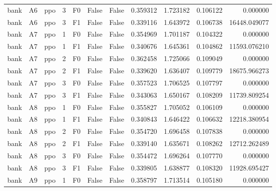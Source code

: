 \begin{tabular}{lllrlllrrrr}
      bank &      A6 &       ppo &     3 &  F0 &           False &            False &  0.359312 &  1.723182 & 0.106122 &         0.000000 \\
      bank &      A6 &       ppo &     3 &  F1 &           False &            False &  0.339116 &  1.643972 & 0.106738 &     16448.049077 \\
      bank &      A7 &       ppo &     1 &  F0 &           False &            False &  0.354969 &  1.701187 & 0.104322 &         0.000000 \\
      bank &      A7 &       ppo &     1 &  F1 &           False &            False &  0.340676 &  1.645361 & 0.104862 &     11593.076210 \\
      bank &      A7 &       ppo &     2 &  F0 &           False &            False &  0.362458 &  1.725066 & 0.109049 &         0.000000 \\
      bank &      A7 &       ppo &     2 &  F1 &           False &            False &  0.339620 &  1.636407 & 0.109779 &     18675.966273 \\
      bank &      A7 &       ppo &     3 &  F0 &           False &            False &  0.357523 &  1.706525 & 0.107797 &         0.000000 \\
      bank &      A7 &       ppo &     3 &  F1 &           False &            False &  0.343063 &  1.650167 & 0.108209 &     11739.809254 \\
      bank &      A8 &       ppo &     1 &  F0 &           False &            False &  0.355827 &  1.705052 & 0.106109 &         0.000000 \\
      bank &      A8 &       ppo &     1 &  F1 &           False &            False &  0.340843 &  1.646422 & 0.106632 &     12218.380954 \\
      bank &      A8 &       ppo &     2 &  F0 &           False &            False &  0.354720 &  1.696458 & 0.107838 &         0.000000 \\
      bank &      A8 &       ppo &     2 &  F1 &           False &            False &  0.339140 &  1.635671 & 0.108262 &     12712.262489 \\
      bank &      A8 &       ppo &     3 &  F0 &           False &            False &  0.354472 &  1.696264 & 0.107770 &         0.000000 \\
      bank &      A8 &       ppo &     3 &  F1 &           False &            False &  0.339805 &  1.638877 & 0.108320 &     11928.695427 \\
      bank &      A9 &       ppo &     1 &  F0 &           False &            False &  0.358797 &  1.713514 & 0.105180 &         0.000000 \\

\end{tabular}
